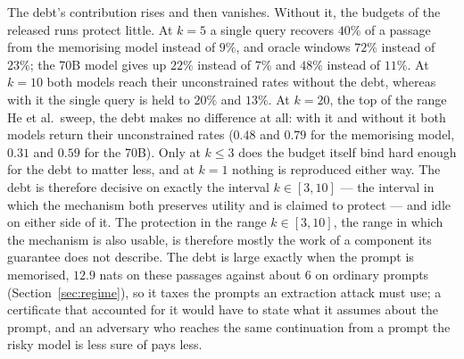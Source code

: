 The debt's contribution rises and then vanishes. Without it, the budgets of the released runs protect little. At $k=5$ a single query recovers $40\%$ of a passage from the memorising model instead of $9\%$, and oracle windows $72\%$ instead of $23\%$; the 70B model gives up $22\%$ instead of $7\%$ and $48\%$ instead of $11\%$. At $k=10$ both models reach their unconstrained rates without the debt, whereas with it the single query is held to $20\%$ and $13\%$. At $k=20$, the top of the range He et al.\ sweep, the debt makes no difference at all: with it and without it both models return their unconstrained rates ($0.48$ and $0.79$ for the memorising model, $0.31$ and $0.59$ for the 70B). Only at $k \le 3$ does the budget itself bind hard enough for the debt to matter less, and at $k=1$ nothing is reproduced either way. The debt is therefore decisive on exactly the interval $k \in [3, 10]$ --- the interval in which the mechanism both preserves utility and is claimed to protect --- and idle on either side of it. The protection in the range $k \in [3, 10]$, the range in which the mechanism is also usable, is therefore mostly the work of a component its guarantee does not describe. The debt is large exactly when the prompt is memorised, $12.9$ nats on these passages against about $6$ on ordinary prompts (Section~\ref{sec:regime}), so it taxes the prompts an extraction attack must use; a certificate that accounted for it would have to state what it assumes about the prompt, and an adversary who reaches the same continuation from a prompt the risky model is less sure of pays less.
